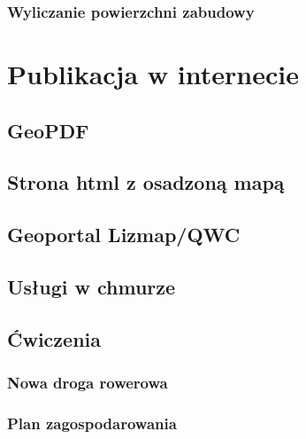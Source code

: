 \documentclass[a4paper,11pt, onecolumn, openany]{memoir}
\begin{document}
\subsection{Wyliczanie powierzchni zabudowy}

\chapter{Publikacja w internecie}
\section{GeoPDF}
\section{Strona html z osadzoną mapą}
\section{Geoportal Lizmap/QWC}
\section{Usługi w chmurze}
\section{Ćwiczenia}
\subsection{Nowa droga rowerowa}
\subsection{Plan zagospodarowania} 
\backmatter	

% 
% 
\end{document}
